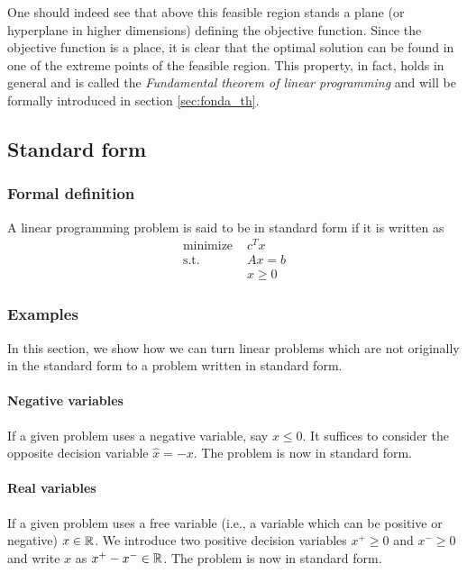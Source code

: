 One should indeed see that above this feasible region stands a plane (or hyperplane in higher dimensions) defining the objective function. Since the objective function is a place, it is clear that the optimal solution can be found in one of the extreme points of the feasible region. This property, in fact, holds in general and is called the \textit{Fundamental theorem of linear programming} and will be formally introduced in section \ref{sec:fonda_th}. 

\subsection{Standard form}

\subsubsection{Formal definition}


\begin{definition}
    A linear programming problem is said to be in standard form if it is written as
    \begin{align*}
        \textrm{minimize } & c^Tx \\
        \textrm{s.t. } & Ax = b\\
        & x\ge 0
    \end{align*}
\end{definition}

\subsubsection{Examples}

In this section, we show how we can turn linear problems which are not originally in the standard form to a problem written in standard form.

\paragraph{Negative variables}
If a given problem uses a negative variable, say $x\le 0$. It suffices to consider the opposite decision variable $\hat x = -x$. The problem is now in standard form. 

\paragraph{Real variables}
If a given problem uses a free variable (i.e., a variable which can be positive or negative) $x\in\mathbb R$. We introduce two positive decision variables $x^+\ge 0$ and $x^-\ge 0$ and write $x$ as $x^+ - x^- \in\mathbb R$. The problem is now in standard form. 

